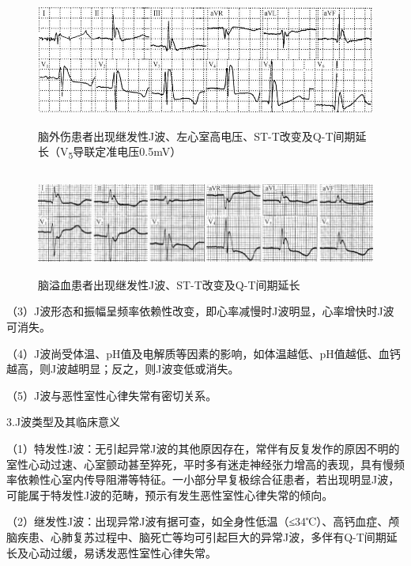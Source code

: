 \begin{figure}[!htbp]
 \centering
 \includegraphics[width=5.48958in,height=1.72917in]{./images/Image00076.jpg}
 \captionsetup{justification=centering}
 \caption{脑外伤患者出现继发性J波、左心室高电压、ST-T改变及Q-T间期延长（V\textsubscript{5}导联定准电压0.5mV）}
 \label{fig4-1}
  \end{figure} 


\begin{figure}[!htbp]
 \centering
 \includegraphics[width=5.78125in,height=1.33333in]{./images/Image00077.jpg}
 \captionsetup{justification=centering}
 \caption{脑溢血患者出现继发性J波、ST-T改变及Q-T间期延长}
 \label{fig4-2}
  \end{figure} 

（3）J波形态和振幅呈频率依赖性改变，即心率减慢时J波明显，心率增快时J波可消失。

（4）J波尚受体温、pH值及电解质等因素的影响，如体温越低、pH值越低、血钙越高，则J波越明显；反之，则J波变低或消失。

（5）J波与恶性室性心律失常有密切关系。

3.J波类型及其临床意义

（1）特发性J波：无引起异常J波的其他原因存在，常伴有反复发作的原因不明的室性心动过速、心室颤动甚至猝死，平时多有迷走神经张力增高的表现，具有慢频率依赖性心室内传导阻滞等特征。一小部分早复极综合征患者，若出现明显J波，可能属于特发性J波的范畴，预示有发生恶性室性心律失常的倾向。

（2）继发性J波：出现异常J波有据可查，如全身性低温（≤34℃）、高钙血症、颅脑疾患、心肺复苏过程中、脑死亡等均可引起巨大的异常J波，多伴有Q-T间期延长及心动过缓，易诱发恶性室性心律失常。

\protect\hypertarget{text00010.htmlux5cux23subid69}{}{}


